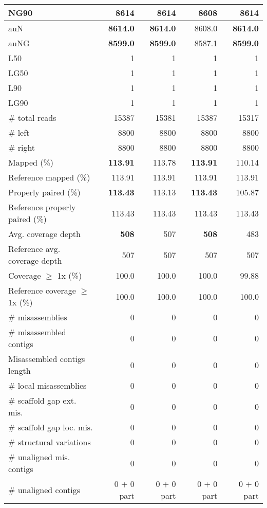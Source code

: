 \documentclass[12pt,a4paper]{article}
\begin{document}
\begin{table}[ht]
\begin{center}
\begin{tabular}{|l*{4}{|r}|}
NG90 & {\bf 8614} & {\bf 8614} & 8608 & {\bf 8614} \\ \hline
auN & {\bf 8614.0} & {\bf 8614.0} & 8608.0 & {\bf 8614.0} \\ \hline
auNG & {\bf 8599.0} & {\bf 8599.0} & 8587.1 & {\bf 8599.0} \\ \hline
L50 & 1 & 1 & 1 & 1 \\ \hline
LG50 & 1 & 1 & 1 & 1 \\ \hline
L90 & 1 & 1 & 1 & 1 \\ \hline
LG90 & 1 & 1 & 1 & 1 \\ \hline
\# total reads & 15387 & 15381 & 15387 & 15317 \\ \hline
\# left & 8800 & 8800 & 8800 & 8800 \\ \hline
\# right & 8800 & 8800 & 8800 & 8800 \\ \hline
Mapped (\%) & {\bf 113.91} & 113.78 & {\bf 113.91} & 110.14 \\ \hline
Reference mapped (\%) & 113.91 & 113.91 & 113.91 & 113.91 \\ \hline
Properly paired (\%) & {\bf 113.43} & 113.13 & {\bf 113.43} & 105.87 \\ \hline
Reference properly paired (\%) & 113.43 & 113.43 & 113.43 & 113.43 \\ \hline
Avg. coverage depth & {\bf 508} & 507 & {\bf 508} & 483 \\ \hline
Reference avg. coverage depth & 507 & 507 & 507 & 507 \\ \hline
Coverage $\geq$ 1x (\%) & 100.0 & 100.0 & 100.0 & 99.88 \\ \hline
Reference coverage $\geq$ 1x (\%) & 100.0 & 100.0 & 100.0 & 100.0 \\ \hline
\# misassemblies & 0 & 0 & 0 & 0 \\ \hline
\# misassembled contigs & 0 & 0 & 0 & 0 \\ \hline
Misassembled contigs length & 0 & 0 & 0 & 0 \\ \hline
\# local misassemblies & 0 & 0 & 0 & 0 \\ \hline
\# scaffold gap ext. mis. & 0 & 0 & 0 & 0 \\ \hline
\# scaffold gap loc. mis. & 0 & 0 & 0 & 0 \\ \hline
\# structural variations & 0 & 0 & 0 & 0 \\ \hline
\# unaligned mis. contigs & 0 & 0 & 0 & 0 \\ \hline
\# unaligned contigs & 0 + 0 part & 0 + 0 part & 0 + 0 part & 0 + 0 part \\ \hline

\end{tabular}
\end{center}
\end{table}
\end{document}
